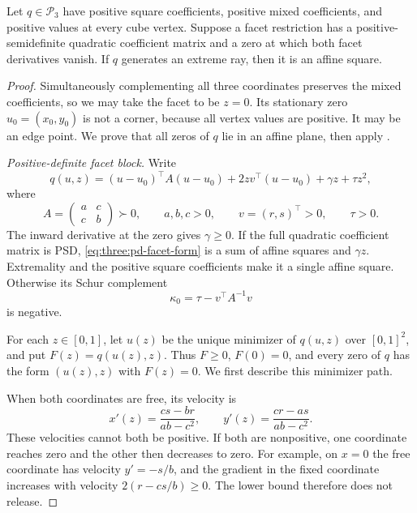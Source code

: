 \begin{lemma}\label{three:stationary-facet}
Let $q\in\mathcal P_3$ have positive square coefficients, positive mixed
coefficients, and positive values at every cube vertex. Suppose a facet
restriction has a positive-semidefinite quadratic coefficient matrix and
a zero at which both facet derivatives vanish. If $q$ generates an
extreme ray, then it is an affine square.
\end{lemma}

\begin{proof}
Simultaneously complementing all three coordinates preserves the mixed
coefficients, so we may take the facet to be $z=0$. Its stationary zero
$u_0=(x_0,y_0)$ is not a corner, because all vertex values are positive.
It may be an edge point. We prove that all zeros of $q$ lie in an affine
plane, then apply .

\smallskip\noindent
\emph{Positive-definite facet block.}
Write
\begin{equation}\label{eq:three:pd-facet-form}
 q(u,z)=(u-u_0)^\top A(u-u_0)
       +2zv^\top(u-u_0)+\gamma z+\tau z^2,
\end{equation}
where
\[
 A=\begin{pmatrix}a&c\\c&b\end{pmatrix}\succ0,
 \qquad a,b,c>0,\qquad v=(r,s)^\top>0,\qquad \tau>0.
\]
The inward derivative at the zero gives $\gamma\ge0$. If the full
quadratic coefficient matrix is PSD, \eqref{eq:three:pd-facet-form} is a
sum of affine squares and $\gamma z$. Extremality and the positive square
coefficients make it a single affine square. Otherwise its Schur
complement
\[
 \kappa_0=\tau-v^\top A^{-1}v
\]
is negative.

For each $z\in[0,1]$, let $u(z)$ be the unique minimizer of $q(u,z)$ over
$[0,1]^2$, and put $F(z)=q(u(z),z)$. Thus $F\ge0$, $F(0)=0$, and every
zero of $q$ has the form $(u(z),z)$ with $F(z)=0$. We first describe this
minimizer path.

When both coordinates are free, its velocity is
\begin{equation}\label{eq:three:pd-velocity}
 x'(z)=\frac{cs-br}{ab-c^2},\qquad
 y'(z)=\frac{cr-as}{ab-c^2}.
\end{equation}
These velocities cannot both be positive. If both are nonpositive, one
coordinate reaches zero and the other then decreases to zero. For example,
on $x=0$ the free coordinate has velocity $y'=-s/b$, and the gradient in
the fixed coordinate increases with velocity $2(r-cs/b)\ge0$.
The lower bound therefore does not release.


\end{proof}
